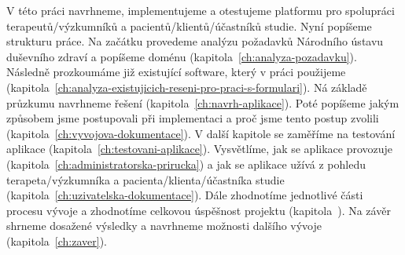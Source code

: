 V této práci navrhneme, implementujeme a otestujeme platformu pro spolupráci terapeutů/výzkumníků a pacientů/klientů/účastníků studie.
Nyní popíšeme strukturu práce.
Na začátku provedeme analýzu požadavků Národního ústavu duševního zdraví a popíšeme doménu (kapitola~\ref{ch:analyza-pozadavku}).
Následně prozkoumáme již existující software, který v práci použijeme (kapitola~\ref{ch:analyza-existujicich-reseni-pro-praci-s-formulari}).
Ná základě průzkumu navrhneme řešení (kapitola~\ref{ch:navrh-aplikace}).
Poté popíšeme jakým způsobem jsme postupovali při implementaci a proč jsme tento postup zvolili (kapitola~\ref{ch:vyvojova-dokumentace}).
V další kapitole se zaměříme na testování aplikace (kapitola~\ref{ch:testovani-aplikace}).
Vysvětlíme, jak se aplikace provozuje (kapitola~\ref{ch:administratorska-prirucka}) a jak se aplikace užívá z pohledu terapeta/výzkumníka a pacienta/klienta/účastníka studie (kapitola~\ref{ch:uzivatelska-dokumentace}).
Dále zhodnotíme jednotlivé části procesu vývoje a zhodnotíme celkovou úspěšnost projektu (kapitola~).
Na závěr shrneme dosažené výsledky a navrhneme možnosti dalšího vývoje (kapitola~\ref{ch:zaver}).